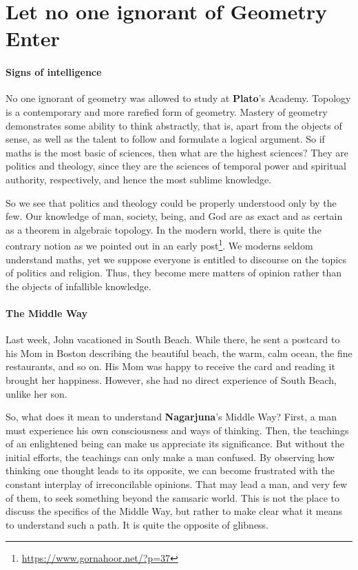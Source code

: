 \section{Let no one ignorant of Geometry Enter}

\paragraph{Signs of intelligence} 

No one ignorant of geometry was allowed to study at \textbf{Plato}'s Academy. Topology is a contemporary and more rarefied form of geometry. Mastery of geometry demonstrates some ability to think abstractly, that is, apart from the objects of sense, as well as the talent to follow and formulate a logical argument. So if maths is the most basic of sciences, then what are the highest sciences? They are politics and theology, since they are the sciences of temporal power and spiritual authority, respectively, and hence the most sublime knowledge.

So we see that politics and theology could be properly understood only by the few. Our knowledge of man, society, being, and God are as exact and as certain as a theorem in algebraic topology. In the modern world, there is quite the contrary notion as we pointed out in an early post\footnote{\url{https://www.gornahoor.net/?p=37}}. We moderns seldom understand maths, yet we suppose everyone is entitled to discourse on the topics of politics and religion. Thus, they become mere matters of opinion rather than the objects of infallible knowledge.

\paragraph{The Middle Way}
Last week, John vacationed in South Beach. While there, he sent a postcard to his Mom in Boston describing the beautiful beach, the warm, calm ocean, the fine restaurants, and so on. His Mom was happy to receive the card and reading it brought her happiness. However, she had no direct experience of South Beach, unlike her son.

So, what does it mean to understand \textbf{Nagarjuna}'s Middle Way? First, a man must experience his own consciousness and ways of thinking. Then, the teachings of an enlightened being can make us appreciate its significance. But without the initial efforts, the teachings can only make a man confused. By observing how thinking one thought leads to its opposite, we can become frustrated with the constant interplay of irreconcilable opinions. That may lead a man, and very few of them, to seek something beyond the samsaric world. This is not the place to discuss the specifics of the Middle Way, but rather to make clear what it means to understand such a path. It is quite the opposite of glibness.

